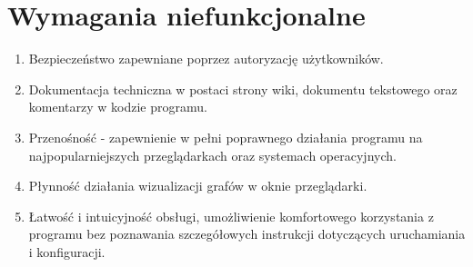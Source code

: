 \section{Wymagania niefunkcjonalne}

\begin{enumerate}
	\item Bezpieczeństwo zapewniane poprzez autoryzację użytkowników.
    \item Dokumentacja techniczna w postaci strony wiki, dokumentu tekstowego oraz komentarzy w kodzie programu.
    \item Przenośność - zapewnienie w pełni poprawnego działania programu na najpopularniejszych przeglądarkach oraz systemach operacyjnych.
    \item Płynność działania wizualizacji grafów w oknie przeglądarki.
    \item Łatwość i intuicyjność obsługi, umożliwienie komfortowego korzystania z programu bez poznawania szczegółowych instrukcji dotyczących uruchamiania i konfiguracji.
\end{enumerate}

